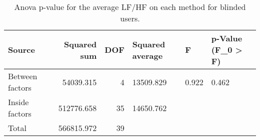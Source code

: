 
\begin{table}[!htb]
\centering
\caption{Anova p-value for the average LF/HF on each method for blinded users.}
\label{tab:anova_average_lfhf}
\begin{tabular}{lrrlll}
\toprule
         Source &  Squared sum &  DOF & Squared average &     F & p-Value (F\_0 > F) \\
\midrule
Between factors &    54039.315 &    4 &       13509.829 & 0.922 &             0.462 \\
 Inside factors &   512776.658 &   35 &       14650.762 &       &                   \\
          Total &   566815.972 &   39 &                 &       &                   \\
\bottomrule
\end{tabular}
\end{table}

